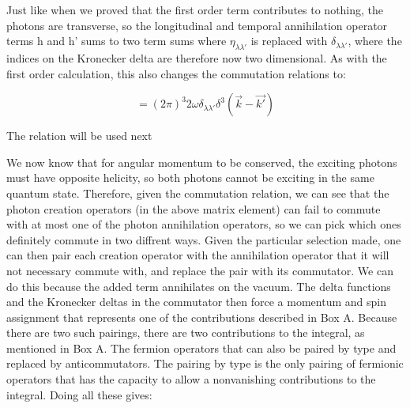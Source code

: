 \documentclass[a4]{article}
\begin{document}
\begin{framed}
            \begin{framed}
                Just like when we proved that the first order term contributes to nothing, the photons are transverse, so the longitudinal and temporal
                annihilation operator terms h and h' sums to two term sums where $\eta_{\lambda \lambda'}$ is replaced with $\delta_{\lambda \lambda'}$,
                where the indices on the Kronecker delta are therefore now two dimensional. As with the first order calculation, this also changes the
                commutation relations to:
                
                \begin{equation}
                    [a_{\lambda} (\vec{k}), a^{\dag}_{\lambda'} (\vec{k'})] = (2 \pi)^{3} 2 \omega \delta_{\lambda \lambda'} \delta^{3} (\vec{k} - \vec{k'})
                \end{equation}

                The relation will be used next
            \end{framed}

            We now know that for angular momentum to be conserved, the exciting photons must have opposite helicity, so both photons cannot be exciting in
            the same quantum state. Therefore, given the commutation relation, we can see that the photon creation operators (in the above matrix element)
            can fail to commute with at most one of the photon annihilation operators, so we can pick which ones definitely commute in two diffrent ways.
            Given the particular selection made, one can then pair each creation operator with the annihilation operator that it will not necessary commute
            with, and replace the pair with its commutator. We can do this because the added term annihilates on the vacuum. The delta functions and the
            Kronecker deltas in the commutator then force a momentum and spin assignment that represents one of the contributions described in Box A. Because
            there are two such pairings, there are two contributions to the integral, as mentioned in Box A. The fermion operators that can also be paired by
            type and replaced by anticommutators. The pairing by type is the only pairing of fermionic operators that has the capacity to allow a nonvanishing
            contributions to the integral. Doing all these gives:


\end{framed}
\end{document}
